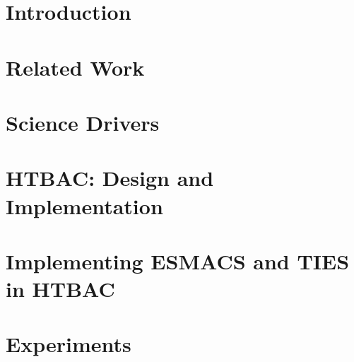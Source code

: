 \documentclass[conference]{IEEEtran}
\begin{document}
\section{Introduction}\label{sec:intro}



\section{Related Work}\label{sec:related-work}



\section{Science Drivers}\label{sec:science-drivers}




\section{HTBAC: Design and Implementation}\label{sec:htbac}



\section{Implementing ESMACS and TIES in
HTBAC}\label{sec:implementation_htbac}



\section{Experiments}\label{sec:experiments}

\end{document}
